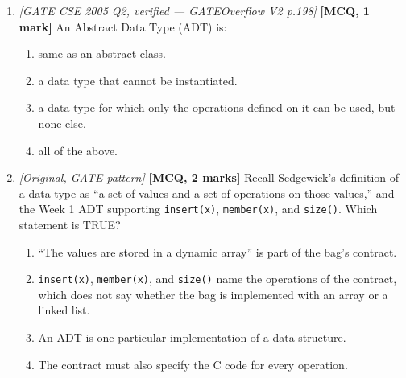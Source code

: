 \documentclass[11pt]{article}
\begin{document}
\begin{enumerate}
\item[\textbf{Q14}] \textit{[GATE CSE 2005 Q2, verified --- GATEOverflow V2 p.198]} \textbf{[MCQ, 1 mark]} An Abstract Data Type (ADT) is:
\begin{enumerate}
  \item[(A)] same as an abstract class.
  \item[(B)] a data type that cannot be instantiated.
  \item[(C)] a data type for which only the operations defined on it can be used, but none else.
  \item[(D)] all of the above.
\end{enumerate}

\item[\textbf{Q15}] \textit{[Original, GATE-pattern]} \textbf{[MCQ, 2 marks]} Recall Sedgewick's definition of a data type as ``a set of values and a set of operations on those values,'' and the Week 1  ADT supporting \texttt{insert(x)}, \texttt{member(x)}, and \texttt{size()}. Which statement is TRUE?
\begin{enumerate}
  \item[(A)] ``The values are stored in a dynamic array'' is part of the bag's contract.
  \item[(B)] \texttt{insert(x)}, \texttt{member(x)}, and \texttt{size()} name the operations of the contract, which does not say whether the bag is implemented with an array or a linked list.
  \item[(C)] An ADT is one particular implementation of a data structure.
  \item[(D)] The contract must also specify the C code for every operation.
\end{enumerate}

\end{enumerate}
\end{document}
